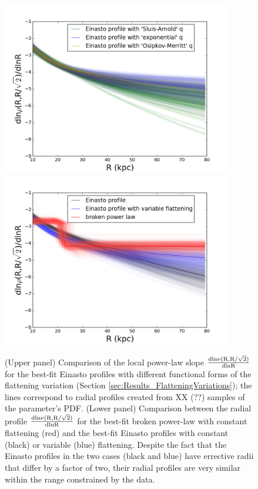 \documentclass[12pt,preprint]{aastex}
\begin{document}
\begin{figure}[htbp]
\centering
\includegraphics[width=0.9\textwidth,height=0.45\textheight]{density_45d_compareqv}
\includegraphics[width=0.9\textwidth,height=0.45\textheight]{density_45d_mcmc}
\caption{(Upper panel) Comparison of the local power-law slope $\rm \frac{dln\nu(R,R/\sqrt{2})}{dlnR}$ for the best-fit Einasto profiles with different functional forms of the flattening variation (Section  \ref{sec:Results_FlatteningVariations}); the lines correspond to radial profiles created from XX (??) samples of the parameter's PDF. (Lower panel) Comparison between the radial profile $\rm \frac{dln\nu(R,R/\sqrt{2})}{dlnR}$ for the best-fit broken power-law with constant flattening (red) and the best-fit Einasto profiles with constant (black) or variable (blue) flattening.
Despite the fact that the Einasto profiles in the two cases (black and blue) have errective radii that differ by a factor of two, their radial profiles are very similar within the range constrained by the data.}
\label{f:fdensity}
\end{figure}
\end{document}
